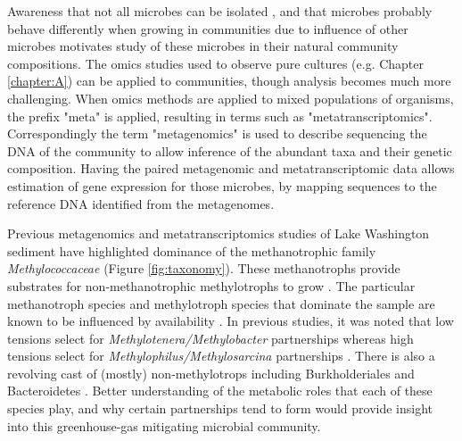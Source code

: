 Awareness that not all microbes can be isolated \cite{kaeberlein2002, stewart2012}, and that microbes probably behave differently when growing in communities due to influence of other microbes \cite{yu2016synthetic} motivates study of these microbes in their natural community compositions.
The omics studies used to observe pure cultures (e.g. Chapter \ref{chapter:A}) can be applied to communities, though analysis becomes much more challenging.
When omics methods are applied to mixed populations of organisms, the prefix "meta" is applied, resulting in terms such as  "metatranscriptomics".
Correspondingly the term "metagenomics" is used to describe sequencing the DNA of the community to allow inference of the abundant taxa and their genetic composition.
Having the paired metagenomic and metatranscriptomic data allows estimation of gene expression for those microbes, by mapping sequences to the reference DNA identified from the metagenomes.

Previous metagenomics and metatranscriptomics studies of Lake Washington sediment have highlighted dominance of the methanotrophic family \textit{Methylococcaceae} \cite{beck2013LW, beck2014LW, oshkin2015LW, hernandez2015LW} (Figure \ref{fig:taxonomy}).
These methanotrophs provide substrates for non-methanotrophic methylotrophs to grow \cite{beck2013LW}.
The particular methanotroph species and methylotroph species that dominate the sample are known to be influenced by  availability \cite{hernandez2015LW}.
In previous studies, it was noted that low  tensions select for \mbox{\textit{Methylotenera/Methylobacter}} partnerships whereas high  tensions select for  \mbox{\textit{Methylophilus/Methylosarcina}} partnerships \cite{hernandez2015LW}.
There is also a revolving cast of (mostly) non-methylotrops including Burkholderiales and Bacteroidetes \cite{kalyuzhnaya2008Burkholderiales, beck2014LW}.  %
Better understanding of the metabolic roles that each of these species play, and why certain partnerships tend to form would provide insight into this greenhouse-gas mitigating microbial community.

